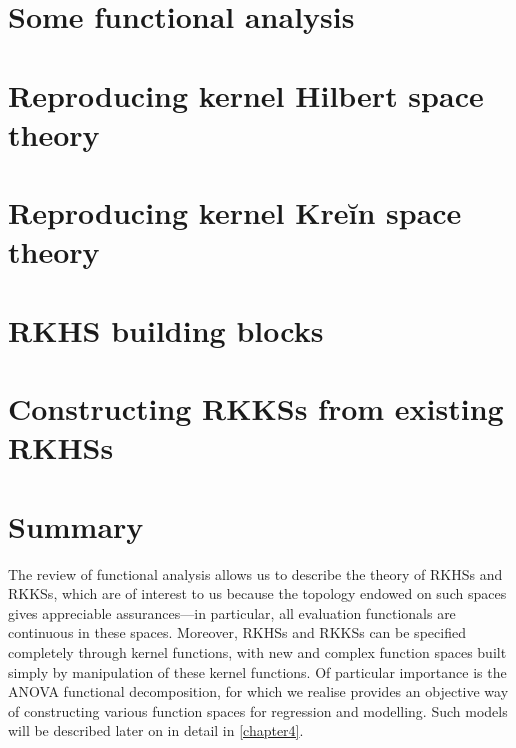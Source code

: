 \documentclass[showframe,11pt]{report}
\begin{document}
%

\section{Some functional analysis}\label{sec:funcanalysis}


\section{Reproducing kernel Hilbert space theory}\label{sec:rkhstheory}


\section{Reproducing kernel Kreĭn space theory}\label{sec:rkkstheory}


\section{RKHS building blocks}\label{sec:rkhsbuild}


\section{Constructing RKKSs from existing RKHSs}\label{sec:constructrkks}


\section{Summary}\label{sec:summarychapter2}

The review of functional analysis allows us to describe the theory of RKHSs and RKKSs, which are of interest to us because the topology endowed on such spaces gives appreciable assurances---in particular, all evaluation functionals are continuous in these spaces.
Moreover, RKHSs and RKKSs can be specified completely through kernel functions, with new and complex function spaces built simply by manipulation of these kernel functions.
Of particular importance is the ANOVA functional decomposition, for which we realise provides an objective way of constructing various function spaces for regression and modelling. 
Such models will be described later on in detail in \cref{chapter4}.
\end{document}
